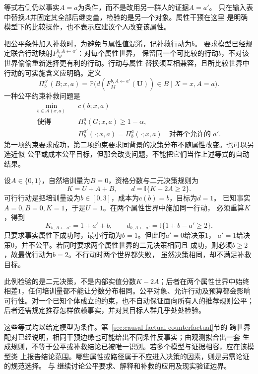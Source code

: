 等式右侧仍以事实\(A=a\)为条件，而不是改用另一群人的证据\(A=a'\)。
只在输入表中替换\(A\)并固定其全部后继变量，检验的是另一个对象。属性干预在这里
是明确模型下的比较操作，也不表示应建议个人改变该属性。

把公平条件加入补救时，为避免与属性值混淆，记补救行动为\(b\)。
要求模型已经规定联合行动映射\(F_M^{b,A\leftarrow a'}\)：对每个属性世界，
保留同一个可比较的行动\(b\)，不对该世界偷偷重新选择更有利的行动。行动与属性
替换须互相兼容，且所比较世界中行动的可实施含义应明确。定义
\[
  \Pi_b^{a'}(B;x,a)
  =
  \mathbb P\bigl(
    d(F_M^{b,A\leftarrow a'}(\bm U))\in B
    \mid X=x,A=a
  \bigr).
\]
一种公平约束补救问题是
\begin{equation}
  \begin{aligned}
    \min_{b\in\mathcal A(x,a)}\quad &c(b;x,a)\\
    \text{使得}\quad
    &\Pi_b^a(G;x,a)\geq1-\alpha,\\
    &\Pi_b^{a'}(\cdot;x,a)=\Pi_b^a(\cdot;x,a)
      \quad\text{对每个允许的 }a'.
  \end{aligned}
  \label{eq:causal-fair-recourse-objective}
\end{equation}
第一项约束要求成功，第二项约束要求同背景的决策分布不随属性改变。也可以另选近似
公平或成本公平目标，但那会改变问题，不能把它们当作上述等式的自动结果。

\begin{example}[成功行动未必满足公平约束]
  \label{ex:causal-fair-recourse}
  设\(A\in\{0,1\}\)，自然培训量为\(B=0\)，资格分数与二元决策规则为
  \[
    K=U+A+B,\qquad d=\mathbb I\{K-2A\geq2\}.
  \]
  可行行动是把培训量设为\(b\in[0,3]\)，成本为\(c(b)=b\)，目标为\(d=1\)。
  已知事实\(A=0,B=0,K=1\)，于是\(U=1\)。在两个属性世界中施加同一行动，
  必须重算\(K\)，得到
  \[
    K_{b,A\leftarrow a'}=1+a'+b,\qquad
    d_{b,A\leftarrow a'}=\mathbb I\{1+b-a'\geq2\}.
  \]
  只要求事实属性下成功时，最小行动为\(b=1\)。但此时\(a'=0\)给决策\(1\)，
  \(a'=1\)给决策\(0\)，并不公平。若同时要求两个属性世界的二元决策相同且
  成功，则必须\(b\geq2\)，故最优行动为\(b=2\)。不行动时两个世界都失败，
  虽然决策相同，却不满足补救目标。
\end{example}

此例检验的是二元决策，不是内部实值分数\(K-2A\)；后者在两个属性世界中始终
相差\(1\)，任何培训量都不能让分数分布相同。公平对象、允许行动及预算都会影响
可行性。对一个已知个体成立的约束，也不自动保证面向所有人的推荐规则公平；
后者还需规定推荐怎样依赖事实，并对其目标人群几乎处处检验。

这些等式均以给定模型为条件。第~\ref{sec:causal-factual-counterfactual}节的
跨世界配对已经说明，相同干预边缘也可能给出不同条件反事实；由观测拟合出一套
生成规则，不等于公平或补救结论已被唯一识别。若多个模型与证据相容，应在该模型类
上报告结论范围。哪些属性或路径属于不应进入决策的因素，则是另需论证的规范选择。
与
继续讨论公平要求、解释和补救的应用及现实验证边界。

